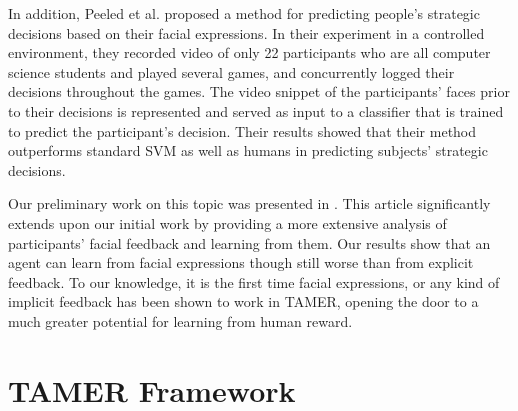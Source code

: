 \documentclass[10pt,journal,compsoc]{IEEEtran}
\begin{document}
In addition, Peeled et al. \cite{peled2013predicting} proposed a method for predicting people's strategic decisions based on their facial expressions. In their experiment in a controlled environment, they recorded video of only 22 participants who are all computer science students and played several games, and concurrently logged their decisions throughout the games. The video snippet of the participants' faces prior to their decisions is represented and served as input to a classifier that is trained to predict the participant's decision. Their results showed that their method outperforms standard SVM as well as humans in predicting subjects' strategic decisions. 

Our preliminary work on this topic was presented in \cite{li2015large,li2016towards}. This article significantly extends upon our initial work by providing a more extensive analysis of participants' facial feedback and learning from them. Our results show that an agent can learn from facial expressions though still worse than from explicit feedback. To our knowledge, it is the first time facial expressions, or any kind of implicit feedback has been shown to work in TAMER, opening the door to a much greater potential for learning from human reward.



\section{TAMER Framework}
\label{sec:tamer}


\end{document}
